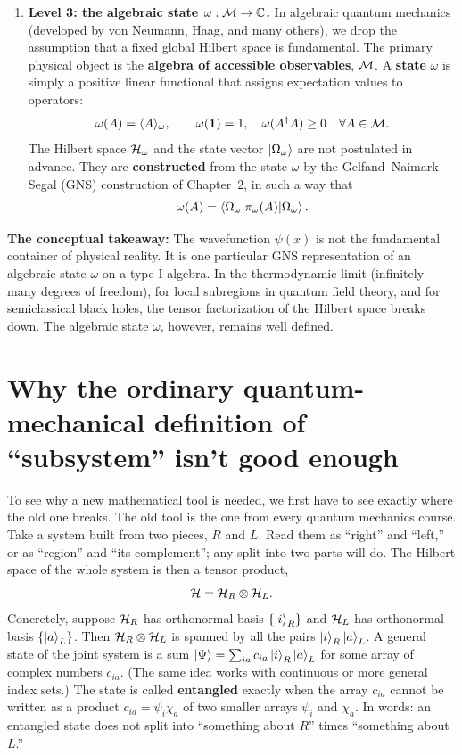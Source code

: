 \begin{enumerate}[leftmargin=*]
\item \textbf{Level 3: the algebraic state $\omega: \mathcal{M} \to \mathbb{C}$.}
In algebraic quantum mechanics (developed by von Neumann, Haag, and many others), we drop the assumption that
a fixed global Hilbert space is fundamental. The primary physical object is the \textbf{algebra of accessible
observables}, $\mathcal{M}$. A \textbf{state} $\omega$ is simply a positive linear functional that assigns
expectation values to operators:
\[
\omega(A) = \langle A \rangle_\omega, \qquad \omega(\mathbf{1}) = 1, \quad \omega(A^\dagger A) \ge 0 \quad \forall A \in \mathcal{M}.
\]
The Hilbert space $\mathcal{H}_\omega$ and the state vector $\ket{\Omega_\omega}$ are not postulated in advance.
They are \textbf{constructed} from the state $\omega$ by the Gelfand--Naimark--Segal (GNS) construction of
Chapter~2, in such a way that
\[
\omega(A) = \braket{\Omega_\omega | \pi_\omega(A) | \Omega_\omega} .
\]
\end{enumerate}

\begin{keyresult}
\textbf{The conceptual takeaway:} The wavefunction $\psi(x)$ is not the fundamental container of physical
reality. It is one particular GNS representation of an algebraic state $\omega$ on a type I algebra. In the
thermodynamic limit (infinitely many degrees of freedom), for local subregions in quantum field theory, and
for semiclassical black holes, the tensor factorization of the Hilbert space breaks down. The algebraic state
$\omega$, however, remains well defined.
\end{keyresult}

\section{Why the ordinary quantum-mechanical definition of ``subsystem'' isn't good enough}

To see why a new mathematical tool is needed, we first have to see exactly where the old one breaks. The old
tool is the one from every quantum mechanics course. Take a system built from two pieces, $R$ and $L$. Read
them as ``right'' and ``left,'' or as ``region'' and ``its complement''; any split into two parts will do. The
Hilbert space of the whole system is then a tensor product,
\[
\mathcal{H} = \mathcal{H}_R\otimes\mathcal{H}_L .
\]
Concretely, suppose $\mathcal{H}_R$ has orthonormal basis $\{\ket i_R\}$ and $\mathcal{H}_L$ has orthonormal basis
$\{\ket a_L\}$. Then $\mathcal{H}_R\otimes\mathcal{H}_L$ is spanned by all the pairs $\ket i_R\ket a_L$. A general state of
the joint system is a sum $\ket\Psi = \sum_{ia} c_{ia}\ket i_R\ket a_L$ for some array of complex numbers
$c_{ia}$. (The same idea works with continuous or more general index sets.) The state is called
\textbf{entangled} exactly when the array $c_{ia}$ cannot be written as a product $c_{ia}=\psi_i\chi_a$ of
two smaller arrays $\psi_i$ and $\chi_a$. In words: an entangled state does not split into ``something about
$R$'' times ``something about $L$.''

